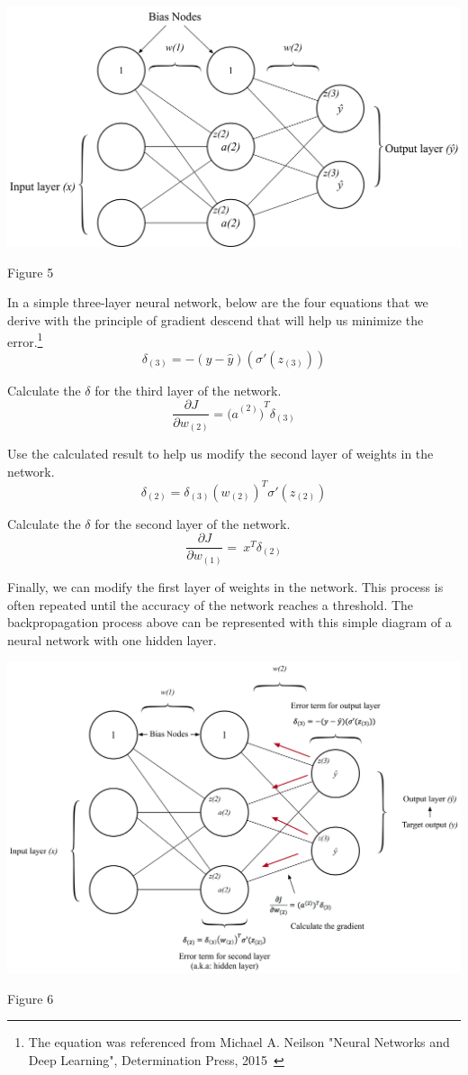 \documentclass[]{article}
\begin{document}
\begin{multicols}{2}
\centerline{\includegraphics[width=1\linewidth]{nn} }
\centerline{Figure 5}
\vspace{0.5cm}

In a simple three-layer neural network, below are the four equations
that we derive with the principle of gradient descend that will help us
minimize the error.\footnote{The equation was referenced from Michael A. Neilson "Neural Networks and Deep Learning", Determination Press, 2015~}
\[\delta_{(3)} = - (y - \hat{y})(\sigma'(z_{(3)}))\]

Calculate the \(\delta\) for the third layer of the network.
\[\frac{\partial J}{\partial w_{(2)}} = {{(a}^{(2)})}^{T}\delta_{(3)}\]

Use the calculated result to help us modify the second layer of weights
in the network.
\[\delta_{(2)} = \delta_{\left( 3 \right)}\left( w_{\left( 2 \right)} \right)^{T}\sigma'(z_{(2)})\]

Calculate the \(\delta\) for the second layer of the network.
\[\frac{\partial J}{\partial w_{(1)}} = \ x^{T}\delta_{(2)}\]

Finally, we can modify the first layer of weights in the network. This
process is often repeated until the accuracy of the network reaches a
threshold. The backpropagation process above can be represented with this simple diagram of a neural network with one hidden layer. 

\centerline{\includegraphics[width=1\linewidth]{nnbp} }
\centerline{Figure 6}
\vspace{0.5cm}


\end{multicols}
\end{document}
